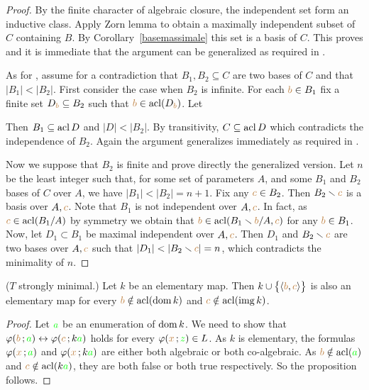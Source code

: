 \begin{proof}
By the finite character of algebraic closure, the independent set form an inductive class.
Apply Zorn lemma to obtain a maximally independent subset of $C$ containing $B$.
By Corollary~\ref{basemassimale} this set is a basis of $C$.
This proves  and it is immediate that the argument can be generalized as required in .

As for , assume for a contradiction that $B_1,B_2\subseteq C$ are two bases of $C$ and that $|B_1|<|B_2|$.
First consider the case when $B_2$ is infinite.
For each ${\color{brown} b}\in B_1$ fix a finite set $D_{\color{brown} b}\subseteq B_2$ such that ${\color{brown} b}\in\mathop{\rm acl}(D_{\color{brown} b})$.
Let


Then $B_1\subseteq\mathop{\rm acl} D$ and $|D|<|B_2|$.
By transitivity, $C\subseteq\mathop{\rm acl} D$ which contradicts the independence of $B_2$.
Again the argument generalizes immediately as required in .

Now we suppose that $B_2$ is finite and prove directly the generalized version.
Let $n$ be the least integer such that, for some set of parameters $A$, and some $B_1$ and $B_2$ bases of $C$ over $A$, we have $|B_1|<|B_2|=n+1$.
Fix any ${\color{brown} c}\in B_2$.
Then $B_2\smallsetminus{\color{brown}c}$ is a basis over $A,{\color{brown} c}$.
Note that $B_1$ is not independent over $A,{\color{brown} c}$.
In fact, as ${\color{brown} c}\in\mathop{\rm acl}(B_1/A)$ by symmetry we obtain that ${\color{brown} b}\in\mathop{\rm acl}(B_1\smallsetminus{\color{brown}b}/A,{\color{brown} c})$ for any ${\color{brown} b}\in B_1$.
Now, let $D_1\subset B_1$ be maximal independent over $A,{\color{brown} c}$.
Then $D_1$ and $B_2\smallsetminus{\color{brown}c}$ are two bases over $A,{\color{brown} c}$ such that $|D_1|<|B_2\sm{\mr c}|=n$, which contradicts the minimality of $n$.
\end{proof}

\begin{proposition}\label{prop_mappetraindipendenti} 
($T$ strongly minimal.) Let $k$ be an elementary map.
Then $k\cup\big\{\langle{\color{brown}b},{\color{brown} c}\rangle\big\}$ is also an elementary map for every ${\color{brown} b}\notin\mathop{\rm acl}(\mathop{\rm dom} k)$ and ${\color{brown} c}\notin\mathop{\rm acl}(\mathop{\rm img} k)$.
\end{proposition}
\begin{proof}
Let ${\color{green} a}$ be an enumeration of $\mathop{\rm dom} k$.
We need to show that $\varphi({\color{brown} b}\,;{\color{green} a})\leftrightarrow\varphi({\color{brown} c}\,;k{\color{green} a})$ holds for every $\varphi({\color{brown} x}\,;{\color{green} z})\in L$.
As $k$ is elementary, the formulas $\varphi({\color{brown} x}\,;{\color{green} a})$ and $\varphi({\color{brown} x}\,;k{\color{green} a})$ are either both algebraic or both co-algebraic.
As ${\color{brown} b}\notin\mathop{\rm acl}({\color{green} a})$ and ${\color{brown} c}\notin\mathop{\rm acl}(k{\color{green} a})$, they are both false or both true respectively.
So the proposition follows.
\end{proof}

